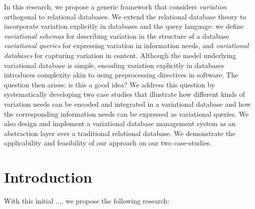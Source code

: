 \documentclass[11pt]{article}
\begin{document}
%
%
%
%
In this research, we propose a generic framework that considers
\emph{variation} orthogonal to relational databases. 
We extend the relational database theory to incorporate variation
explicitly in databases and the query language:
we define \emph{variational schemas} for describing variation in the structure of a database
\emph{variational queries} for expressing variation in information needs, 
and \emph{variational databases} for capturing variation in content. 
%
Although the model underlying variational database is simple, encoding variation
explicitly in databases introduces complexity akin to using preprocessing
directives in software. The question then arises: is this a good idea?
We address this question by systematically developing two case studies
that illustrate how different kinds of variation needs can be encoded and
integrated in a variational database and how the
corresponding information needs can be expressed as variational queries.
%
We also design and implement a variational database management system as an abstraction layer over a traditional relational database. We demonstrate the applicability and feasibility of our approach on our two case-studies.


\section{Introduction}
\label{sec:intro}


With this initial ..., we propose the following research:
\end{document}
